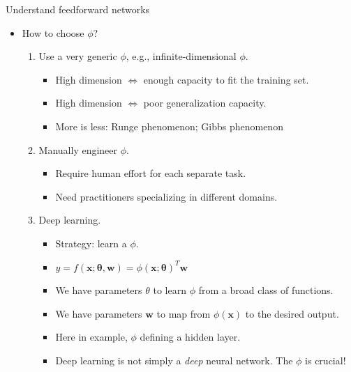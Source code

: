 \documentclass[10pt]{beamer}
\begin{document}
	\begin{frame}{Understand feedforward networks}
		\begin{itemize}
			\item How to choose $\phi$?
			\begin{enumerate}
				\item Use a very generic $\phi$, e.g., infinite-dimensional $\phi$.
				\begin{itemize}
					\item High dimension $\Leftrightarrow$ enough capacity to fit the training set.
					\item High dimension $\Leftrightarrow$ poor generalization capacity.
					\item More is less: Runge phenomenon; Gibbs phenomenon 
				\end{itemize}
				\item Manually engineer $\phi$.
				\begin{itemize}
					\item Require human effort for each separate task.
					\item Need practitioners specializing in different domains.
				\end{itemize}
				\item Deep learning.
				\begin{itemize}
					\item Strategy: learn a $\phi$.
					\item $y=f(\bm{x};\bm{\theta},\bm{w})=\phi(\bm{x};\bm{\theta})^T\bm{w}$
					\item We have parameters $\theta$ to learn $\phi$ from a broad class of functions.
					\item We have parameters $\bm{w}$ to map from $\phi(\bm{x})$ to the desired output.
					\item Here in example, $\phi$ defining a hidden layer.
					\item Deep learning is not simply a \emph{deep} neural network. The $\phi$ is crucial!
				\end{itemize}
			\end{enumerate}
		\end{itemize}
	\end{frame}
	
\end{document}
